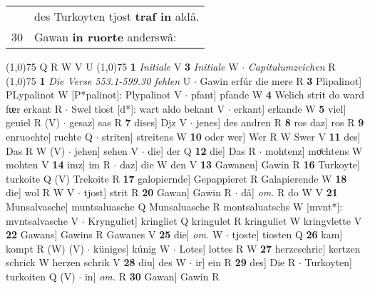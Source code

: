 \documentclass[8pt,a4paper,notitlepage]{article}
\begin{document}
\begin{table}[ht]
\begin{minipage}[t]{0.5\linewidth}
\begin{tabular}{rl}
 & des Turkoyten tjost \textbf{traf in} aldâ.\\ 
30 & Gawan \textbf{in ruorte} anderswâ:\\ 
\end{tabular}
\scriptsize
\line(1,0){75} \newline
Q R W V U \newline
\line(1,0){75} \newline
\textbf{1} \textit{Initiale} V  \textbf{3} \textit{Initiale} W   $\cdot$ \textit{Capitulumzeichen} R  \newline
\line(1,0){75} \newline
\textbf{1} \textit{Die Verse 553.1-599.30 fehlen} U   $\cdot$ Gawin erfúr die mere R \textbf{3} Plipalinot] PLypalinot W [P*palinot]: Plypalinot V  $\cdot$ pfant] pfande W \textbf{4} Welich strit do ward fᵫr erkant R  $\cdot$ Swel tiost [d*]: wart aldo bekant V  $\cdot$ erkant] erkande W \textbf{5} viel] geuiel R (V)  $\cdot$ gesaz] sas R \textbf{7} dises] Djz V  $\cdot$ jenes] des andren R \textbf{8} ros daz] ros R \textbf{9} enruochte] ruchte Q  $\cdot$ striten] streitens W \textbf{10} oder wer] Wer R W Swer V \textbf{11} des] Das R W (V)  $\cdot$ jehen] sehen V  $\cdot$ die] der Q \textbf{12} die] Das R  $\cdot$ mohtenz] moͤchtens W mohten V \textbf{14} imz] im R  $\cdot$ daz] die W den V \textbf{13} Gawanen] Gawin R \textbf{16} Turkoyte] turkoite Q (V) Trekoite R \textbf{17} galopiernde] Gepappieret R Galapierende W \textbf{18} die] wol R W V  $\cdot$ tjost] strit R \textbf{20} Gawan] Gawin R  $\cdot$ dâ] \textit{om.} R do W V \textbf{21} Munsalvasche] muntsaluasche Q Munsaluasche R montsaluatschs W [mvnt*]: mvntsalvasche V  $\cdot$ Krynguliet] kringliet Q kringulet R kringuliet W kringvlette V \textbf{22} Gawans] Gawins R Gawanes V \textbf{25} die] \textit{om.} W  $\cdot$ tjoste] tiosten Q \textbf{26} kam] kompt R (W) (V)  $\cdot$ küniges] kúnig W  $\cdot$ Lotes] lottes R W \textbf{27} herzeschric] kertzen schrick W herzen schrik V \textbf{28} diu] des W  $\cdot$ ir] ein R \textbf{29} des] Die R  $\cdot$ Turkoyten] turkoiten Q (V)  $\cdot$ in] \textit{om.} R \textbf{30} Gawan] Gawin R \newline
\end{minipage}
\end{table}
\end{document}
